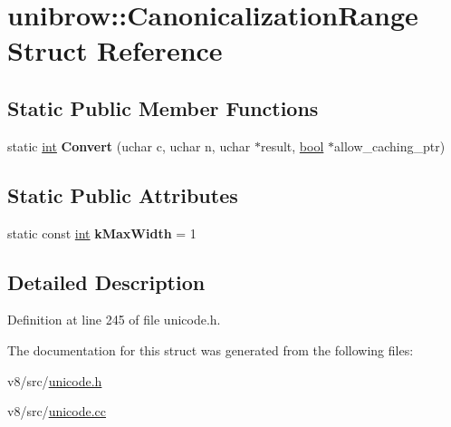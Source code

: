 \hypertarget{structunibrow_1_1CanonicalizationRange}{}\section{unibrow\+:\+:Canonicalization\+Range Struct Reference}
\label{structunibrow_1_1CanonicalizationRange}
\subsection*{Static Public Member Functions}
\begin{DoxyCompactItemize}
\item 
\mbox{\label{structunibrow_1_1CanonicalizationRange_a61fdb751fa4e4206a9e649177c219da4}} 
static \mbox{\hyperlink{classint}{int}} {\bfseries Convert} (uchar c, uchar n, uchar $\ast$result, \mbox{\hyperlink{classbool}{bool}} $\ast$allow\+\_\+caching\+\_\+ptr)
\end{DoxyCompactItemize}
\subsection*{Static Public Attributes}
\begin{DoxyCompactItemize}
\item 
\mbox{\label{structunibrow_1_1CanonicalizationRange_a00a80bc3e640dab47c411eb8876bc872}} 
static const \mbox{\hyperlink{classint}{int}} {\bfseries k\+Max\+Width} = 1
\end{DoxyCompactItemize}


\subsection{Detailed Description}


Definition at line 245 of file unicode.\+h.



The documentation for this struct was generated from the following files\+:\begin{DoxyCompactItemize}
\item 
v8/src/\mbox{\hyperlink{unicode_8h}{unicode.\+h}}\item 
v8/src/\mbox{\hyperlink{unicode_8cc}{unicode.\+cc}}\end{DoxyCompactItemize}
